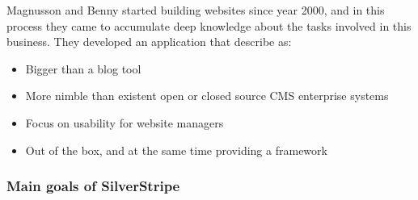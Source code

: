 \documentclass[11pt]{article} %
\begin{document}
Magnusson and Benny started building websites since year 2000, and in this process they came to accumulate deep knowledge about the tasks involved in this business. They developed an application that describe as:

  	\begin{itemize}
  	  \item Bigger than a blog tool
  	  \item More nimble than existent open or closed source CMS enterprise systems
  	  \item Focus on usability for website managers
  	  \item Out of the box, and at the same time providing a framework
  	\end{itemize}

\subsubsection{Main goals of SilverStripe}
\end{document}
